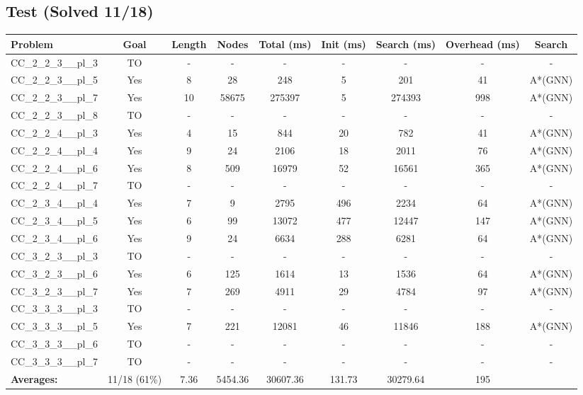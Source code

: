 \documentclass{article}
\begin{document}
\subsection*{Test (Solved 11/18)}
\begin{tabular}{lcccccccc}
\toprule
Problem & Goal & Length & Nodes & Total (ms) & Init (ms) & Search (ms) & Overhead (ms) & Search \\
\midrule
CC\_2\_2\_3\_\_pl\_3 & TO & - & - & - & - & - & - & - \\
CC\_2\_2\_3\_\_pl\_5 & Yes & 8 & 28 & 248 & 5 & 201 & 41 & A*(GNN) \\
CC\_2\_2\_3\_\_pl\_7 & Yes & 10 & 58675 & 275397 & 5 & 274393 & 998 & A*(GNN) \\
CC\_2\_2\_3\_\_pl\_8 & TO & - & - & - & - & - & - & - \\
CC\_2\_2\_4\_\_pl\_3 & Yes & 4 & 15 & 844 & 20 & 782 & 41 & A*(GNN) \\
CC\_2\_2\_4\_\_pl\_4 & Yes & 9 & 24 & 2106 & 18 & 2011 & 76 & A*(GNN) \\
CC\_2\_2\_4\_\_pl\_6 & Yes & 8 & 509 & 16979 & 52 & 16561 & 365 & A*(GNN) \\
CC\_2\_2\_4\_\_pl\_7 & TO & - & - & - & - & - & - & - \\
CC\_2\_3\_4\_\_pl\_4 & Yes & 7 & 9 & 2795 & 496 & 2234 & 64 & A*(GNN) \\
CC\_2\_3\_4\_\_pl\_5 & Yes & 6 & 99 & 13072 & 477 & 12447 & 147 & A*(GNN) \\
CC\_2\_3\_4\_\_pl\_6 & Yes & 9 & 24 & 6634 & 288 & 6281 & 64 & A*(GNN) \\
CC\_3\_2\_3\_\_pl\_3 & TO & - & - & - & - & - & - & - \\
CC\_3\_2\_3\_\_pl\_6 & Yes & 6 & 125 & 1614 & 13 & 1536 & 64 & A*(GNN) \\
CC\_3\_2\_3\_\_pl\_7 & Yes & 7 & 269 & 4911 & 29 & 4784 & 97 & A*(GNN) \\
CC\_3\_3\_3\_\_pl\_3 & TO & - & - & - & - & - & - & - \\
CC\_3\_3\_3\_\_pl\_5 & Yes & 7 & 221 & 12081 & 46 & 11846 & 188 & A*(GNN) \\
CC\_3\_3\_3\_\_pl\_6 & TO & - & - & - & - & - & - & - \\
CC\_3\_3\_3\_\_pl\_7 & TO & - & - & - & - & - & - & - \\
\textbf{Averages:} & 11/18 (61\%) & 7.36 & 5454.36 & 30607.36 & 131.73 & 30279.64 & 195 & \\
\bottomrule
\end{tabular}
\\[0.7cm]
\end{document}

